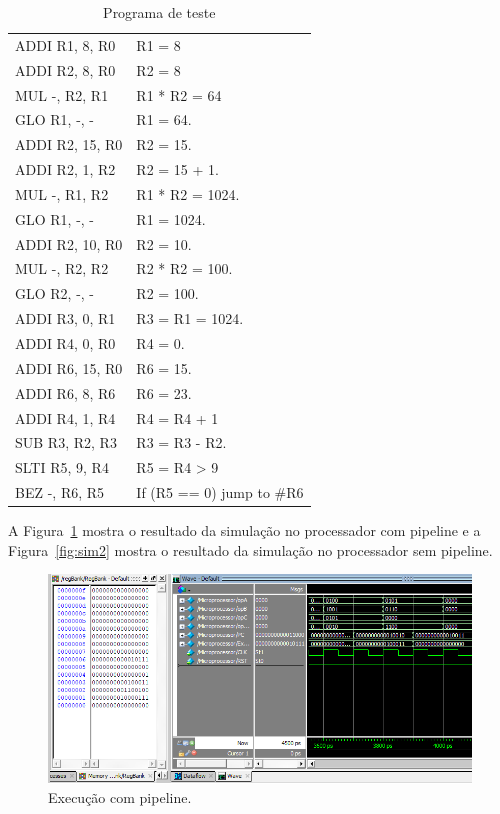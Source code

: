 \documentclass[11pt,a4paper,titlepage]{article}
\begin{document}
\begin{table}[!h]
\centering
\begin{tabular}{| l | l |}
\hline
ADDI R1, 8, R0   &  R1 = 8                             \\
ADDI R2, 8, R0   &  R2 = 8                             \\
MUL  -, R2, R1   &  R1 * R2 = 64                       \\
GLO  R1, -, -    &  R1 = 64.                           \\
ADDI R2, 15, R0  &  R2 = 15.                           \\
ADDI R2, 1, R2   &  R2 = 15 + 1.                       \\
MUL  -, R1, R2   &  R1 * R2 = 1024.                    \\
GLO  R1, -, -    &  R1 = 1024.                         \\
ADDI R2, 10, R0  &  R2 = 10.                           \\
MUL  -, R2, R2   &  R2 * R2 = 100.                     \\
GLO  R2, -, -    &  R2 = 100.                          \\
ADDI R3, 0, R1   &  R3 = R1 = 1024.                    \\
ADDI R4, 0, R0   &  R4 = 0.                            \\
ADDI R6, 15, R0  &  R6 = 15.                           \\
ADDI R6, 8, R6   &  R6 = 23.                           \\
ADDI R4, 1, R4   &  R4 = R4 + 1                        \\
SUB  R3, R2, R3  &  R3 = R3 - R2.                      \\
SLTI R5, 9, R4   &  R5 = R4 > 9                        \\
BEZ   -, R6, R5  &  If (R5 == 0) { jump to \#R6 }        \\
\hline
\end{tabular}
\caption{Programa de teste}
\label{tab:program}
\end{table}

A Figura~\ref{fig:sim1} mostra o resultado da simulação no processador com pipeline e a Figura~\ref{fig:sim2} mostra o resultado da simulação no processador sem pipeline.

\begin{figure}[!h]
\centering
\includegraphics[scale=0.5]{images/sim1.png}
\caption{Execução com pipeline.}
\label{fig:sim1}
\end{figure}
\end{document}
